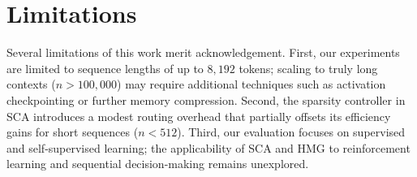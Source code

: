 \section{Limitations}

Several limitations of this work merit acknowledgement. First, our experiments are
limited to sequence lengths of up to $8{,}192$ tokens; scaling to truly long contexts
($n > 100{,}000$) may require additional techniques such as activation checkpointing or
further memory compression. Second, the sparsity controller in SCA introduces a modest
routing overhead that partially offsets its efficiency gains for short sequences
($n < 512$). Third, our evaluation focuses on supervised and self-supervised learning;
the applicability of SCA and HMG to reinforcement learning and sequential
decision-making remains unexplored.
